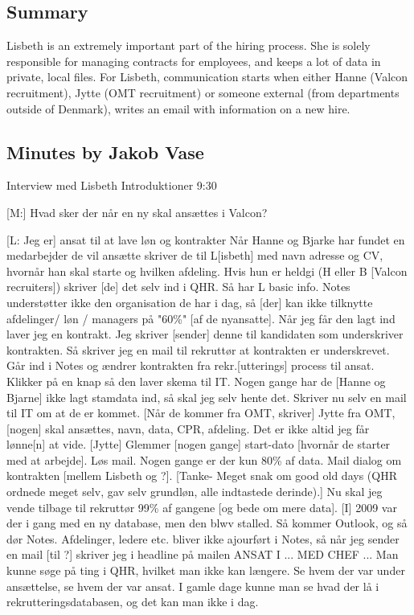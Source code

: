 \label{app:lisbeth}

\subsection{Summary}
Lisbeth is an extremely important part of the hiring process. She is solely responsible for managing contracts for employees, and keeps a lot of data in private, local files. 
For Lisbeth, communication starts when either Hanne (Valcon recruitment), Jytte (OMT recruitment) or someone external (from departments outside of Denmark), writes an email with information on a new hire.


\subsection{Minutes by Jakob Vase}

Interview med Lisbeth
Introduktioner
9:30

[M:] Hvad sker der når en ny skal ansættes i Valcon?

[L: Jeg er] ansat til at lave løn og kontrakter
Når Hanne og Bjarke har fundet en medarbejder de vil ansætte skriver de til L[isbeth] med navn adresse og CV, hvornår han skal starte og hvilken afdeling.
Hvis hun er heldgi (H eller B [Valcon recruiters]) skriver [de] det selv ind i QHR. Så har L basic info. Notes understøtter ikke den organisation de har i dag, så [der] kan ikke tilknytte afdelinger/ løn / managers på "60\%" [af de nyansatte]. Når jeg får den lagt ind laver jeg en kontrakt. Jeg skriver [sender] denne til kandidaten som underskriver kontrakten.
Så skriver jeg en mail til rekruttør at kontrakten er underskrevet. Går ind i Notes og ændrer kontrakten fra rekr.[utterings] process til ansat. Klikker på en knap så den laver skema til IT. Nogen gange har de [Hanne og Bjarne] ikke lagt stamdata ind, så skal jeg selv hente det.
Skriver nu selv en mail til IT om at de er kommet.
[Når de kommer fra OMT, skriver] Jytte fra OMT, [nogen] skal ansættes, navn, data, CPR, afdeling. Det er ikke altid jeg får lønne[n] at vide. [Jytte] Glemmer [nogen gange] start-dato [hvornår de starter med at arbejde]. Løs mail. Nogen gange er der kun 80\% af data.
Mail dialog om kontrakten [mellem Lisbeth og ?].
[Tanke- Meget snak om good old days (QHR ordnede meget selv, gav selv grundløn, alle indtastede derinde).]
Nu skal jeg vende tilbage til rekruttør 99\% af gangene [og bede om mere data].
[I] 2009 var der i gang med en ny database, men den blwv stalled. Så kommer Outlook, og så dør Notes. Afdelinger, ledere etc. bliver ikke ajourført i Notes, så når jeg sender en mail [til ?] skriver jeg i headline på mailen ANSAT I ... MED CHEF ...
Man kunne søge på ting i QHR, hvilket man ikke kan længere. Se hvem der var under ansættelse, se hvem der var ansat. I gamle dage kunne man se hvad der lå i rekrutteringsdatabasen, og det kan man ikke i dag.

